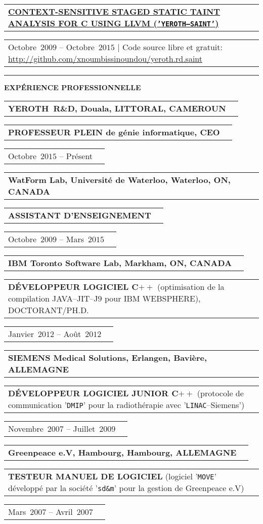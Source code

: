\documentclass[9pt,a4paper]{article} %
\makeatletter
\newcommand{\headerrow}[2]
{\begin{tabular*}{\linewidth}{l@{\extracolsep{\fill}}r}
	#1 &
	#2 \\
\end{tabular*}}
\newcommand{\headerrowONE}[1]{\headerrow{#1}{}}
\newcommand{\cplusplus}{C$++$\xspace}
\newcommand{\cvitemdate}[2]{#1~$#2$\xspace}
\newcommand{\cvitempositionheld}[1]{\textbf{#1}\xspace}
\makeatother
\begin{document}
\vspace{0.3em}

\headerrowONE{\href{http://archive.org/details/saint_201507}{\textbf{CONTEXT-SENSITIVE STAGED STATIC TAINT ANALYSIS FOR C USING LLVM (\texttt{'YEROTH--SAINT'})}}}
\headerrowONE{\cvitemdate{Octobre}{2009} -- \cvitemdate{Octobre}{2015} | Code source libre et gratuit: \url{http://github.com/xnoumbissinoundou/yeroth.rd.saint}}
	
\vspace{1em}


\hrule
\begin{center}
{\large \textbf{EXPÉRIENCE PROFESSIONNELLE}}
\end{center}

\vspace{0.5em}

\headerrowONE{\textbf{YEROTH~R\&D, Douala, LITTORAL, CAMEROUN}}
\headerrowONE{\cvitempositionheld{PROFESSEUR PLEIN de génie informatique, CEO}}
\headerrowONE{\cvitemdate{Octobre}{2015} -- Présent}	

\vspace{0.3em}

\headerrowONE{\textbf{WatForm Lab, Université de Waterloo, Waterloo, ON, CANADA}}	
\headerrowONE{\cvitempositionheld{ASSISTANT D'ENSEIGNEMENT}}
\headerrowONE{\cvitemdate{Octobre}{2009} -- \cvitemdate{Mars}{2015}}
	
\vspace{0.3em}

\headerrowONE{\textbf{IBM Toronto Software Lab, Markham, ON, CANADA}}	
\headerrowONE{\cvitempositionheld{DÉVELOPPEUR LOGICIEL \cplusplus} (optimisation de la compilation JAVA--JIT--J$9$
	pour IBM WEBSPHERE), DOCTORANT/PH.D.}
\headerrowONE{\cvitemdate{Janvier}{2012} -- \cvitemdate{Août}{2012}}	

\vspace{0.3em}

\headerrowONE{\textbf{SIEMENS Medical Solutions, Erlangen, Bavière, ALLEMAGNE}}	
\headerrowONE{\cvitempositionheld{DÉVELOPPEUR LOGICIEL JUNIOR \cplusplus} (protocole 
de communication '\texttt{DMIP}' pour la radiothérapie avec '\texttt{LINAC}--Siemens')}
\headerrowONE{\cvitemdate{Novembre}{2007} -- \cvitemdate{Juillet}{2009}}	
	
\vspace{0.3em}

\headerrowONE{\textbf{Greenpeace e.V, Hambourg, Hambourg, ALLEMAGNE}}	
\headerrowONE{\cvitempositionheld{TESTEUR MANUEL DE LOGICIEL} 
(logiciel '\texttt{MOVE}' développé par la société '\texttt{sd\&m}' pour la gestion de Greenpeace e.V)}
\headerrowONE{\cvitemdate{Mars}{2007} -- \cvitemdate{Avril}{2007}}	
\end{document}
